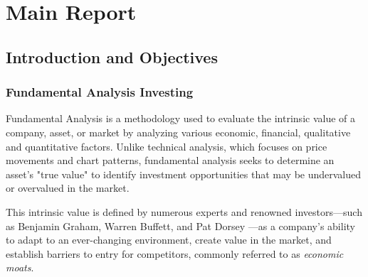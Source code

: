 \documentclass[11pt,english,a4paper,hidelinks]{book}
\begin{document}
\tableofcontents
\newpage

\listoffigures
\newpage

\listoftables
\newpage



\clearpage
{}
\setcounter{page}{1}

\part{Main Report}

\chapter{Introduction and Objectives }
\section{Fundamental Analysis Investing}

\noindent Fundamental Analysis is a methodology used to evaluate the intrinsic value of a company, asset, or market by analyzing various economic, financial, qualitative and quantitative factors. Unlike technical analysis, which focuses on price movements and chart patterns, fundamental analysis seeks to determine an asset's "true value" to identify investment opportunities that may be undervalued or overvalued in the market.

\vspace{0.5cm}
\noindent This intrinsic value is defined by numerous experts and renowned investors—such as Benjamin Graham, Warren Buffett, and Pat Dorsey \cite{dorsey2011five}—as a company's ability to adapt to an ever-changing environment, create value in the market, and establish barriers to entry for competitors, commonly referred to as \textit{economic moats}.
\end{document}
